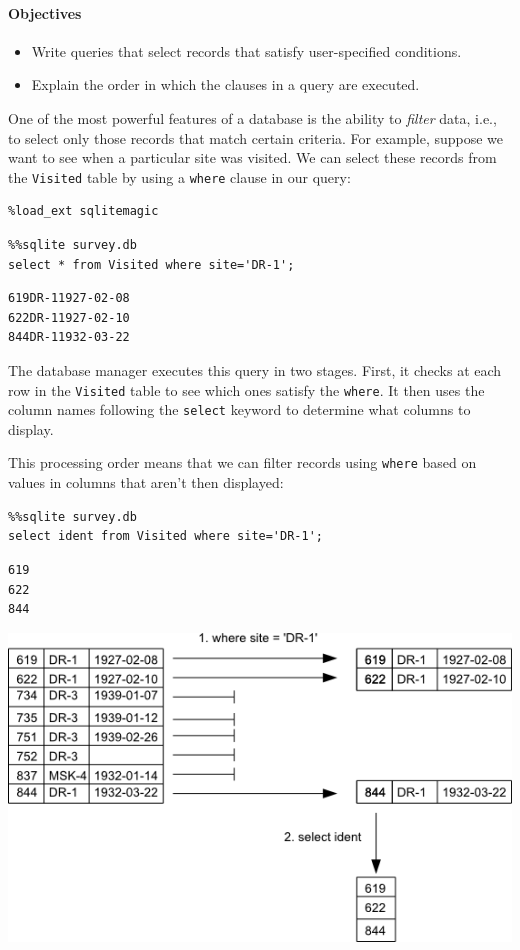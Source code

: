 \documentclass[]{book}
\newcommand{\gdef}[2]{\emph{#2}}
\begin{document}
\mbox{}\paragraph{Objectives}

\begin{itemize}
\item
  Write queries that select records that satisfy user-specified
  conditions.
\item
  Explain the order in which the clauses in a query are executed.
\end{itemize}

One of the most powerful features of a database is the ability to
\gdef{g:filter}{filter} data, i.e., to select only those records
that match certain criteria. For example, suppose we want to see when a
particular site was visited. We can select these records from the
\texttt{Visited} table by using a \texttt{where} clause in our query:

\begin{verbatim}
%load_ext sqlitemagic
\end{verbatim}

\begin{verbatim}
%%sqlite survey.db
select * from Visited where site='DR-1';
\end{verbatim}

\begin{verbatim}
619DR-11927-02-08
622DR-11927-02-10
844DR-11932-03-22
\end{verbatim}

The database manager executes this query in two stages. First, it checks
at each row in the \texttt{Visited} table to see which ones satisfy the
\texttt{where}. It then uses the column names following the
\texttt{select} keyword to determine what columns to display.

This processing order means that we can filter records using
\texttt{where} based on values in columns that aren't then displayed:

\begin{verbatim}
%%sqlite survey.db
select ident from Visited where site='DR-1';
\end{verbatim}

\begin{verbatim}
619
622
844
\end{verbatim}

\includegraphics{novice/sql/img/sql-filter.png}
\end{document}
